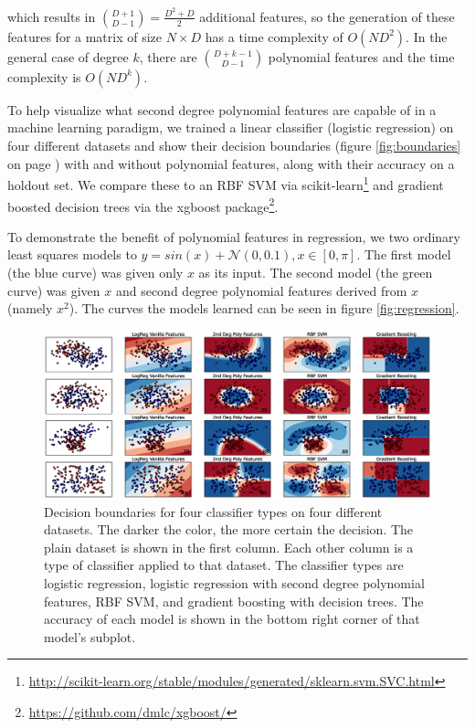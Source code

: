 \documentclass[11pt,twocolumn]{article}
\begin{document}
which results in $\binom{D+1}{D-1} = \frac{D^2+D}{2}$ additional features, so the generation of 
these features for a matrix of size $N \times D$ has a time complexity of $O(ND^2)$. In the general case of degree $k$, there 
are $\binom{D+k-1}{D-1}$ polynomial features and the time complexity is $O(ND^k)$.

To help visualize what second degree polynomial features are capable of in a machine learning paradigm,
we trained a linear classifier (logistic regression) on four different datasets and show their decision
boundaries (figure \eqref{fig:boundaries} on page \pageref{fig:boundaries}) with and without polynomial features, along with their accuracy on a holdout set. We compare
these to an RBF SVM via scikit-learn\footnote{\url{http://scikit-learn.org/stable/modules/generated/sklearn.svm.SVC.html}} 
and gradient boosted decision trees via the xgboost package\footnote{\url{https://github.com/dmlc/xgboost/}}.

To demonstrate the benefit of polynomial features in regression, we two ordinary least squares models to $y=sin(x) + \mathcal{N}(0, 0.1), x \in [0, \pi]$. The first model (the blue curve) was given only $x$ as its input. The second model (the green curve) was given $x$ and second degree polynomial features derived from $x$ (namely $x^2$). The curves the models learned can be seen in figure \ref{fig:regression}.


\begin{figure}
    \centering
    \includegraphics[scale=0.3]{boundaries.eps}
    
     \caption{\footnotesize{Decision boundaries for four classifier types on four different datasets. The darker the color, the more certain the decision.
             The plain dataset is shown in the first column. Each other column is a type of classifier applied to that dataset. The classifier
             types are logistic regression, logistic regression with second degree polynomial features, RBF SVM, and gradient boosting with decision trees.
             The accuracy of each model is shown in the bottom right corner of that model's subplot.}}
    \label{fig:boundaries}
\end{figure}
\end{document}
